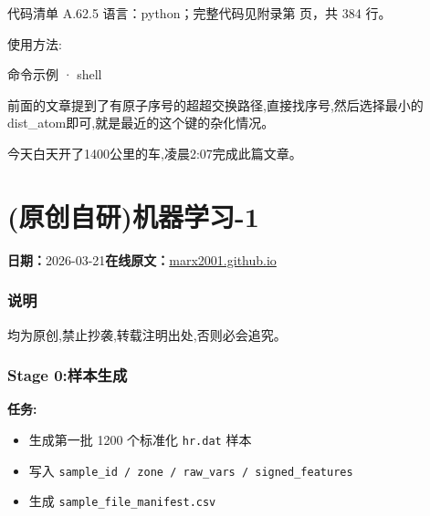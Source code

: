 \documentclass[lang=cn,scheme=chinese,color=blue,device=normal,toc=onecol,math=cm]{elegantbook}
\begin{document}
\begin{codeindexbox}{代码清单 A.62.5}
语言：python；完整代码见附录第 \pageref{code:62:5} 页，共 384 行。
\end{codeindexbox}


使用方法:\par


\begin{inlinecodebox}{命令示例 · shell}
\end{inlinecodebox}


前面的文章提到了有原子序号的超超交换路径,直接找序号,然后选择最小的dist\_\allowbreak{}atom即可,就是最近的这个键的杂化情况。\par


今天白天开了1400公里的车,凌晨2:07完成此篇文章。\par



\section{(原创自研)机器学习-1}
\begin{articlemeta}
\textbf{日期：}2026-03-21\hfill\textbf{在线原文：}\href{https://marx2001.github.io/sci-note\_posts/20260321-ML1}{marx2001.github.io}
\end{articlemeta}

\subsubsection{说明}


均为原创,禁止抄袭,转载注明出处,否则必会追究。\par


\subsubsection{Stage 0:样本生成}


\textbf{任务:}\par


\begin{itemize}
\item 生成第一批 1200 个标准化 \texttt{hr.dat} 样本
\item 写入 \texttt{sample\_\allowbreak{}id /\allowbreak{} zone /\allowbreak{} raw\_\allowbreak{}vars /\allowbreak{} signed\_\allowbreak{}features}
\item 生成 \texttt{sample\_\allowbreak{}file\_\allowbreak{}manifest.csv}
\end{itemize}
\end{document}
